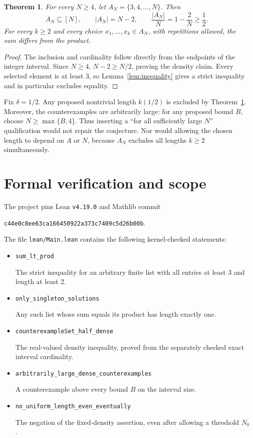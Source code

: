 \documentclass[11pt]{article}
\newtheorem{theorem}{Theorem}
\begin{document}
\begin{theorem}\label{thm:counterexample}
For every $N\ge4$, let $A_N=\{3,4,\ldots,N\}$. Then
\[
 A_N\subseteq[N],\qquad |A_N|=N-2,\qquad
 \frac{|A_N|}{N}=1-\frac2N\ge\frac12.
\]
For every $k\ge2$ and every choice $x_1,\ldots,x_k\in A_N$, with repetitions
allowed, the sum differs from the product.
\end{theorem}
\begin{proof}
The inclusion and cardinality follow directly from the endpoints of the
integer interval. Since $N\ge4$, $N-2\ge N/2$, proving the density claim.
Every selected element is at least $3$, so Lemma~\ref{lem:inequality}
gives a strict inequality and in particular excludes equality.
\end{proof}

Fix $\delta=1/2$. Any proposed nontrivial length $k(1/2)$ is excluded by
Theorem~\ref{thm:counterexample}. Moreover, the counterexamples are
arbitrarily large: for any proposed bound $B$, choose $N\ge\max\{B,4\}$.
Thus inserting a ``for all sufficiently large $N$'' qualification would
not repair the conjecture. Nor would allowing the chosen length to depend
on $A$ or $N$, because $A_N$ excludes all lengths $k\ge2$ simultaneously.

\section{Formal verification and scope}
The project pins Lean \texttt{v4.19.0} and Mathlib commit
\par\noindent
\texttt{c44e0c8ee63ca166450922a373c7409c5d26b00b}.
\par
The file \texttt{lean/Main.lean} contains the following kernel-checked
statements:
\begin{itemize}
\item \texttt{sum\_lt\_prod}\par
      The strict inequality for an arbitrary finite list with all entries
      at least $3$ and length at least $2$.
\item \texttt{only\_singleton\_solutions}\par
      Any such list whose sum equals its product has length exactly one.
\item \texttt{counterexampleSet\_half\_dense}\par
      The real-valued density inequality, proved from the separately
      checked exact interval cardinality.
\item \texttt{arbitrarily\_large\_dense\_counterexamples}\par
      A counterexample above every bound $B$ on the interval size.
\item \texttt{no\_uniform\_length\_even\_eventually}\par
      The negation of the fixed-density assertion, even after allowing a
      threshold $N_0$.
\end{itemize}
\end{document}
